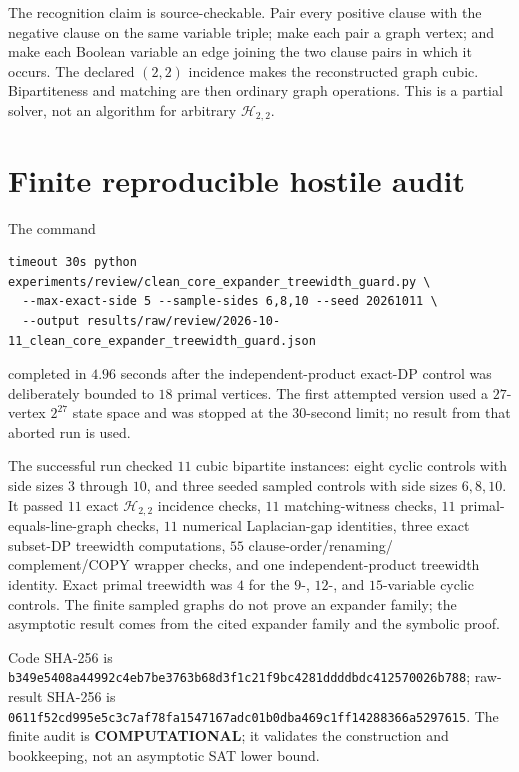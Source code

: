 \documentclass[11pt]{article}
\newcommand{\status}[1]{\textbf{#1}}
\begin{document}
The recognition claim is source-checkable.  Pair every positive clause with
the negative clause on the same variable triple; make each pair a graph
vertex; and make each Boolean variable an edge joining the two clause pairs
in which it occurs.  The declared $(2,2)$ incidence makes the reconstructed
graph cubic.  Bipartiteness and matching are then ordinary graph operations.
This is a partial solver, not an algorithm for arbitrary
\(\mathcal H_{2,2}\).

\section{Finite reproducible hostile audit}
The command
\begin{verbatim}
timeout 30s python experiments/review/clean_core_expander_treewidth_guard.py \
  --max-exact-side 5 --sample-sides 6,8,10 --seed 20261011 \
  --output results/raw/review/2026-10-11_clean_core_expander_treewidth_guard.json
\end{verbatim}
completed in $4.96$ seconds after the independent-product exact-DP control
was deliberately bounded to $18$ primal vertices.  The first attempted
version used a $27$-vertex $2^{27}$ state space and was stopped at the
$30$-second limit; no result from that aborted run is used.

The successful run checked $11$ cubic bipartite instances: eight cyclic
controls with side sizes $3$ through $10$, and three seeded sampled controls
with side sizes $6,8,10$.  It passed $11$ exact
\(\mathcal H_{2,2}\) incidence checks, $11$ matching-witness checks,
$11$ primal-equals-line-graph checks, $11$ numerical Laplacian-gap identities,
three exact subset-DP treewidth computations, $55$ clause-order/renaming/
complement/COPY wrapper checks, and one independent-product treewidth
identity.  Exact primal treewidth was $4$ for the $9$-, $12$-, and
$15$-variable cyclic controls.  The finite sampled graphs do not prove an
expander family; the asymptotic result comes from the cited expander family
and the symbolic proof.

Code SHA-256 is
\nolinkurl{b349e5408a44992c4eb7be3763b68d3f1c21f9bc4281ddddbdc412570026b788};
raw-result SHA-256 is
\nolinkurl{0611f52cd995e5c3c7af78fa1547167adc01b0dba469c1ff14288366a5297615}.
The finite audit is \status{COMPUTATIONAL}; it validates the construction and
bookkeeping, not an asymptotic SAT lower bound.
\end{document}
